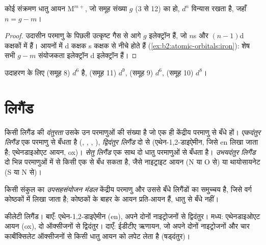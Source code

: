 \begin{proposition}[d इलेक्ट्रॉनों की गिनती]\label{prop:b2:coordination-complexes:dn}
कोई संक्रमण धातु आयन $\mathrm M^{m+}$, जो समूह संख्या $g$ (3 से 12) का हो,
$d^n$ विन्यास रखता है, जहाँ $n = g - m$।
\end{proposition}

\begin{proof}
उदासीन परमाणु के पिछली उत्कृष्ट गैस से आगे $g$ इलेक्ट्रॉन हैं, जो $n$s और
$(n - 1)$d कक्षकों में हैं। आयनों में d कक्षक s कक्षक से नीचे होते हैं
(\cref{ex:b2:atomic-orbitals:iron}): शेष सभी $g - m$ संयोजकता इलेक्ट्रॉन d
इलेक्ट्रॉन हैं।
\end{proof}

उदाहरण के लिए  (समूह 8) $d^6$ है,  (समूह 11) $d^9$,  (समूह 9)
$d^6$,  (समूह 10) $d^8$।

\section{लिगैंड}

\begin{definition}[दंतुरता]\label{def:b2:coordination-complexes:denticity}
किसी लिगैंड की \emph{दंतुरता} उसके उन परमाणुओं की संख्या है जो
एक ही केंद्रीय परमाणु से बँधे हों। \emph{एकदंतुर लिगैंड}
एक परमाणु से बँधता है (, , , ), \emph{द्विदंतुर
लिगैंड} दो से (एथेन-1,2-डाइऐमीन, जिसे en लिखा जाता है;
एथेनडाइओएट आयन, ox)। \emph{सेतु लिगैंड} एक साथ दो
धातु परमाणुओं से बँधता है। \emph{उभयदंतुर लिगैंड}
दो भिन्न परमाणुओं में से किसी एक से बँध सकता है, जैसे नाइट्राइट आयन (N या O से) या
थायोसायनेट (S या N से)।
\end{definition}

\begin{definition}[उपसहसंयोजन मंडल]\label{def:b2:coordination-complexes:coordination-sphere}
किसी संकुल का \emph{उपसहसंयोजन मंडल} केंद्रीय परमाणु
और उससे बँधे लिगैंडों का समुच्चय है, जिसे वर्ग कोष्ठकों में लिखा जाता है; कोष्ठकों के
बाहर के आयन प्रति-आयन हैं, धातु से बँधे नहीं।
\end{definition}

\begin{omfigure}
\qquad
{}
\qquad
{}

\medskip
{\small कीलेटी लिगैंड। बाएँ: एथेन-1,2-डाइऐमीन (en), अपने दोनों
नाइट्रोजनों से द्विदंतुर। मध्य: एथेनडाइओएट आयन (ox), दो ऑक्सीजनों से द्विदंतुर। दाएँ:
ईडीटीए ऋणायन, जो अपने दोनों नाइट्रोजनों और चार
कार्बॉक्सिलेट ऑक्सीजनों से किसी धातु आयन को लपेट लेता है (षड्दंतुर)।}
\end{omfigure}

